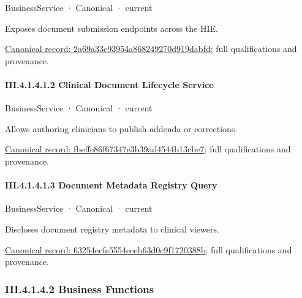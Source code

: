 \label{element:2a69a33c93954a868249270d919dabfd}
{\small BusinessService · Canonical · current}\par

Exposes document submission endpoints across the HIE.


{\footnotesize \href{../../../../continuum/business/business-service/2a69a33c93954a868249270d919dabfd.md}{Canonical record: 2a69a33c93954a868249270d919dabfd}; full qualifications and provenance.}\par
\paragraph*{III.4.1.4.1.2 Clinical Document Lifecycle Service}
\label{navigation:III.4.1.4.1.2}

\label{element:fbeffe86f67347e3b39ad4544b13cbe7}
{\small BusinessService · Canonical · current}\par

Allows authoring clinicians to publish addenda or corrections.


{\footnotesize \href{../../../../continuum/business/business-service/fbeffe86f67347e3b39ad4544b13cbe7.md}{Canonical record: fbeffe86f67347e3b39ad4544b13cbe7}; full qualifications and provenance.}\par
\paragraph*{III.4.1.4.1.3 Document Metadata Registry Query}
\label{navigation:III.4.1.4.1.3}

\label{element:63254ecfe5554eeeb63d0c9f1720388b}
{\small BusinessService · Canonical · current}\par

Discloses document registry metadata to clinical viewers.


{\footnotesize \href{../../../../continuum/business/business-service/63254ecfe5554eeeb63d0c9f1720388b.md}{Canonical record: 63254ecfe5554eeeb63d0c9f1720388b}; full qualifications and provenance.}\par
\subsubsection*{III.4.1.4.2 Business Functions}
\label{navigation:III.4.1.4.2}

